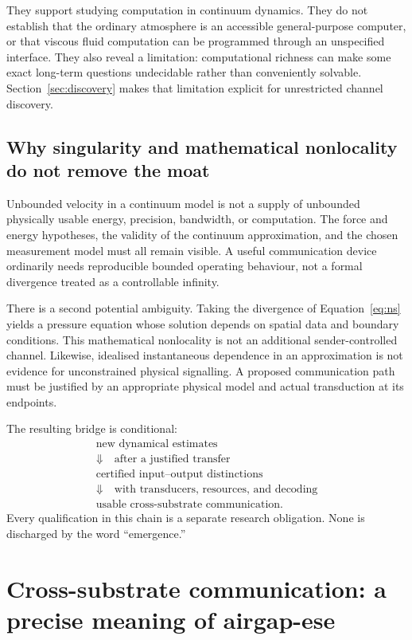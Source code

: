 \documentclass[11pt,a4paper]{article}
\theoremstyle{definition}
\theoremstyle{remark}
\begin{document}
They support studying computation in continuum dynamics. They do not establish that the ordinary atmosphere is an accessible general-purpose computer, or that viscous fluid computation can be programmed through an unspecified interface. They also reveal a limitation: computational richness can make some exact long-term questions undecidable rather than conveniently solvable. Section~\ref{sec:discovery} makes that limitation explicit for unrestricted channel discovery.

\subsection{Why singularity and mathematical nonlocality do not remove the moat}
Unbounded velocity in a continuum model is not a supply of unbounded physically usable energy, precision, bandwidth, or computation. The force and energy hypotheses, the validity of the continuum approximation, and the chosen measurement model must all remain visible. A useful communication device ordinarily needs reproducible bounded operating behaviour, not a formal divergence treated as a controllable infinity.

There is a second potential ambiguity. Taking the divergence of Equation~\eqref{eq:ns} yields a pressure equation whose solution depends on spatial data and boundary conditions. This mathematical nonlocality is not an additional sender-controlled channel. Likewise, idealised instantaneous dependence in an approximation is not evidence for unconstrained physical signalling. A proposed communication path must be justified by an appropriate physical model and actual transduction at its endpoints.

The resulting bridge is conditional:
\begin{equation}\label{eq:bridge}
\begin{gathered}
 \text{new dynamical estimates}\\
 \Downarrow\quad\text{after a justified transfer}\\
 \text{certified input--output distinctions}\\
 \Downarrow\quad\text{with transducers, resources, and decoding}\\
 \text{usable cross-substrate communication}.
\end{gathered}
\end{equation}
Every qualification in this chain is a separate research obligation. None is discharged by the word ``emergence.''

\section{Cross-substrate communication: a precise meaning of airgap-ese}\label{sec:channels}
\end{document}
